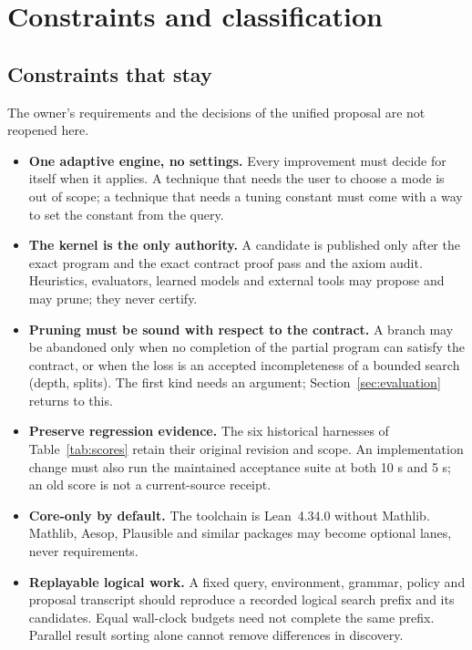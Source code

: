 \section{Constraints and classification}\label{sec:classification}

\subsection{Constraints that stay}

The owner's requirements and the decisions of the unified proposal are not reopened here.

\begin{itemize}
\item \textbf{One adaptive engine, no settings.} Every improvement must decide for itself when it applies. A technique that needs the user to choose a mode is out of scope; a technique that needs a tuning constant must come with a way to set the constant from the query.
\item \textbf{The kernel is the only authority.} A candidate is published only after the exact program and the exact contract proof pass  and the axiom audit. Heuristics, evaluators, learned models and external tools may propose and may prune; they never certify.
\item \textbf{Pruning must be sound with respect to the contract.} A branch may be abandoned only when no completion of the partial program can satisfy the contract, or when the loss is an accepted incompleteness of a bounded search (depth, splits). The first kind needs an argument; Section~\ref{sec:evaluation} returns to this.
\item \textbf{Preserve regression evidence.} The six historical harnesses of Table~\ref{tab:scores} retain their original revision and scope. An implementation change must also run the maintained acceptance suite at both 10 s and 5 s; an old score is not a current-source receipt.
\item \textbf{Core-only by default.} The toolchain is Lean~4.34.0 without Mathlib. Mathlib, Aesop, Plausible and similar packages may become optional lanes, never requirements.
\item \textbf{Replayable logical work.} A fixed query, environment, grammar, policy and proposal transcript should reproduce a recorded logical search prefix and its candidates. Equal wall-clock budgets need not complete the same prefix. Parallel result sorting alone cannot remove differences in discovery.
\end{itemize}

